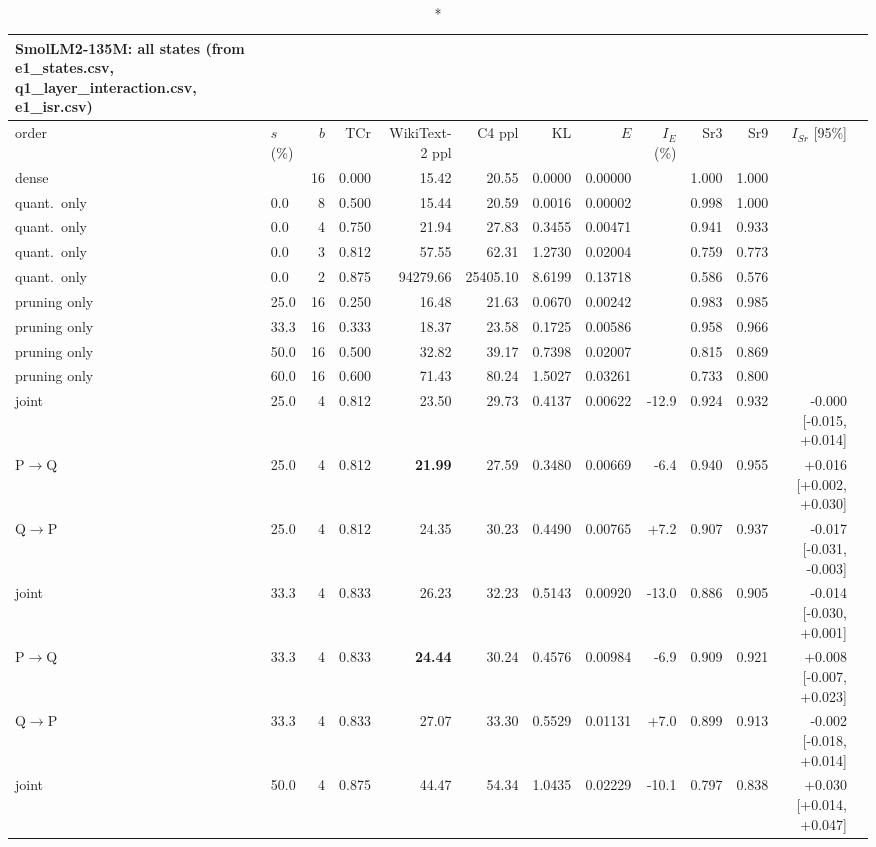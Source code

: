 \documentclass{article}
\begin{document}
\begin{longtable}{llrrrrrrrrrrl}
\caption*{\textbf{SmolLM2-135M}: all states (from e1\_states.csv, q1\_layer\_interaction.csv, e1\_isr.csv)}\\
\toprule order & $s$ (\%) & $b$ & TCr & WikiText-2 ppl & C4 ppl & KL & $E$ & $I_E$ (\%) & Sr3 & Sr9 & $I_{Sr}$ [95\%] \\ \midrule \endhead
dense &  & 16 & 0.000 & 15.42 & 20.55 & 0.0000 & 0.00000 &  & 1.000 & 1.000 &  \\
quant.\ only & 0.0 & 8 & 0.500 & 15.44 & 20.59 & 0.0016 & 0.00002 &  & 0.998 & 1.000 &  \\
quant.\ only & 0.0 & 4 & 0.750 & 21.94 & 27.83 & 0.3455 & 0.00471 &  & 0.941 & 0.933 &  \\
quant.\ only & 0.0 & 3 & 0.812 & 57.55 & 62.31 & 1.2730 & 0.02004 &  & 0.759 & 0.773 &  \\
quant.\ only & 0.0 & 2 & 0.875 & 94279.66 & 25405.10 & 8.6199 & 0.13718 &  & 0.586 & 0.576 &  \\
pruning only & 25.0 & 16 & 0.250 & 16.48 & 21.63 & 0.0670 & 0.00242 &  & 0.983 & 0.985 &  \\
pruning only & 33.3 & 16 & 0.333 & 18.37 & 23.58 & 0.1725 & 0.00586 &  & 0.958 & 0.966 &  \\
pruning only & 50.0 & 16 & 0.500 & 32.82 & 39.17 & 0.7398 & 0.02007 &  & 0.815 & 0.869 &  \\
pruning only & 60.0 & 16 & 0.600 & 71.43 & 80.24 & 1.5027 & 0.03261 &  & 0.733 & 0.800 &  \\
joint & 25.0 & 4 & 0.812 & 23.50 & 29.73 & 0.4137 & 0.00622 & -12.9 & 0.924 & 0.932 & -0.000 [-0.015, +0.014] \\
P$\to$Q & 25.0 & 4 & 0.812 & \textbf{21.99} & 27.59 & 0.3480 & 0.00669 & -6.4 & 0.940 & 0.955 & +0.016 [+0.002, +0.030] \\
Q$\to$P & 25.0 & 4 & 0.812 & 24.35 & 30.23 & 0.4490 & 0.00765 & +7.2 & 0.907 & 0.937 & -0.017 [-0.031, -0.003] \\
joint & 33.3 & 4 & 0.833 & 26.23 & 32.23 & 0.5143 & 0.00920 & -13.0 & 0.886 & 0.905 & -0.014 [-0.030, +0.001] \\
P$\to$Q & 33.3 & 4 & 0.833 & \textbf{24.44} & 30.24 & 0.4576 & 0.00984 & -6.9 & 0.909 & 0.921 & +0.008 [-0.007, +0.023] \\
Q$\to$P & 33.3 & 4 & 0.833 & 27.07 & 33.30 & 0.5529 & 0.01131 & +7.0 & 0.899 & 0.913 & -0.002 [-0.018, +0.014] \\
joint & 50.0 & 4 & 0.875 & 44.47 & 54.34 & 1.0435 & 0.02229 & -10.1 & 0.797 & 0.838 & +0.030 [+0.014, +0.047] \\

\end{longtable}
\end{document}
